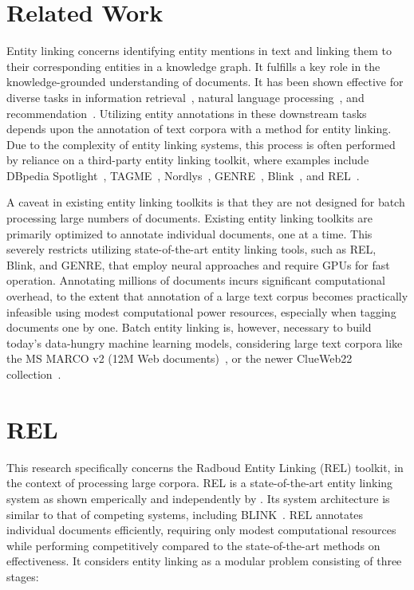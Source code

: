 \section{Related Work}\label{sec:related-work}
Entity linking concerns identifying entity mentions in text and linking them to their corresponding entities in a knowledge graph. It fulfills a key role in the knowledge-grounded understanding of documents. It has been shown effective for diverse tasks in information retrieval~\citep{Gerritse:2020:GEER, Gerritse:2022:EMBERT, doc-ranking-entity, el-ranking-hasibi, el-balog, query-recommendation-entity, chatterjee2022bert}, natural language processing~\citep{lin-etal-2012-entity, watson}, and recommendation~\citep{yang-etal-2018-collective}.
Utilizing entity annotations in these downstream tasks depends upon the annotation of text corpora with a method for entity linking. Due to the complexity of entity linking systems, this process is often performed by reliance on a third-party entity linking toolkit, where examples include DBpedia Spotlight~\citep{dbpedia-spotlight}, TAGME~\citep{tagme}, Nordlys~\citep{nordlys}, GENRE~\citep{genre}, Blink~\citep{blink}, and REL~\citep{rel}.

A caveat in existing entity linking toolkits is that they are not designed for batch processing large numbers of documents. Existing entity linking toolkits are primarily optimized to annotate individual documents, one at a time. This severely restricts utilizing state-of-the-art entity linking tools, such as REL, Blink, and GENRE, that employ neural approaches and require GPUs for fast operation. Annotating millions of documents incurs significant computational overhead, to the extent that annotation of a large text corpus becomes practically infeasible using modest computational power resources, especially when tagging documents one by one. Batch entity linking is, however, necessary to build today's data-hungry machine learning models, considering large text corpora like the MS MARCO v2 (12M Web documents)~\citep{msmarco}, or the newer ClueWeb22 collection~\citep{clueweb22}.

\section{REL}
This research specifically concerns the Radboud Entity Linking (REL) toolkit, in the context of processing large corpora. REL is a state-of-the-art entity linking system as shown emperically and independently by \citet{bast-etal-2023-fair}. Its system architecture is similar to that of competing systems, including BLINK~\citep{blink}.
REL annotates individual documents efficiently, requiring only modest computational resources while performing competitively compared to the state-of-the-art methods on effectiveness. It considers entity linking as a modular problem consisting of three stages:

